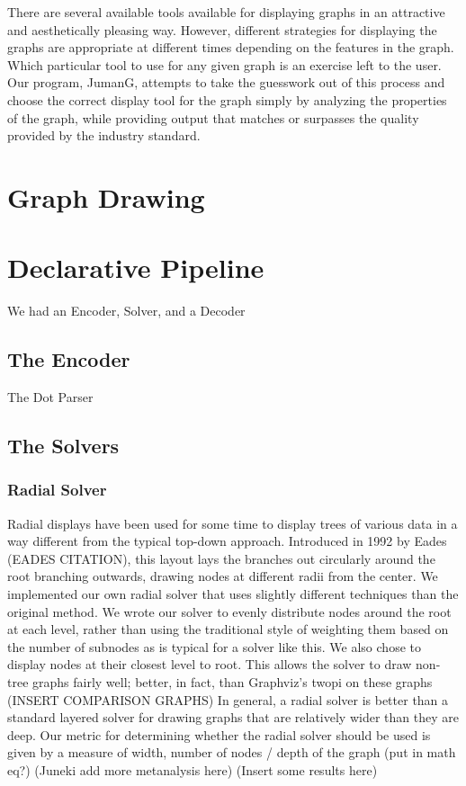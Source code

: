\documentclass{article}
\begin{document}
There are several available tools available for displaying graphs in an attractive and aesthetically pleasing way. 
However, different strategies for displaying the graphs are appropriate at different times depending on the features in the graph. Which 
particular tool to use for any given graph is an exercise left to the user. Our program, JumanG, attempts to take the guesswork out of 
this process and choose the correct display tool for the graph simply by analyzing the properties of the graph, while providing output that 
matches or surpasses the quality provided by the industry standard.


\section{Graph Drawing}


\section{Declarative Pipeline}

We had an Encoder, Solver, and a Decoder

\subsection{The Encoder}
The Dot Parser

\subsection{The Solvers}

\subsubsection{Radial Solver}
Radial displays have been used for some time to display trees of various data in a way different from the typical top-down approach.
Introduced in 1992 by Eades (EADES CITATION), this layout lays the branches out circularly around the root branching outwards, drawing 
nodes at different radii from the center. We implemented our own radial solver that uses slightly different techniques than the original
method. We wrote our solver to evenly distribute nodes around the root at each level, rather than using the traditional style of weighting 
them based on the number of subnodes as is typical for a solver like this. We also chose to display nodes at their closest level to root. 
This allows the solver to draw non-tree graphs fairly well; better, in fact, than Graphviz's twopi on these graphs (INSERT COMPARISON GRAPHS) 
In general, a radial solver is better than a standard layered solver for drawing graphs that are relatively wider than they are deep. Our metric 
for determining whether the radial solver should be used is given by a measure of width, number of nodes / depth of the graph (put in math eq?) (Juneki
add more metanalysis here) (Insert some results here)
\end{document}

